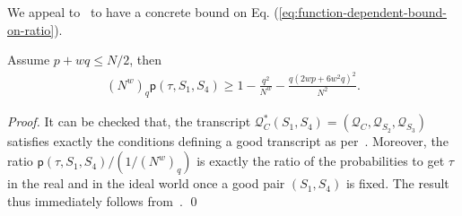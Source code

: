 We appeal to~\cite{C:CDKLST18} to have a concrete bound on Eq. (\ref{eq:function-dependent-bound-on-ratio}).

\begin{lemma}
	\label{lemma:bound-middle-two-rounds}
	
	Assume $p+wq\leq N/2$, then
	\begin{align}
	(N^w)_q{\mathsf{p}(\tau,S_1,S_4)} \geq 1-\frac{q^2}{N^w}-\frac{q(2wp+6w^2q)^2}{N^2}.
	\label{eq:bound-on-epsilon-middle}
	\end{align}
\end{lemma}
\begin{proof}
It can be checked that, the transcript $\mathcal{Q}_C^*(S_1,S_4)=(\mathcal{Q}_C,\mathcal{Q}_{S_2},\mathcal{Q}_{S_3})$ satisfies exactly the conditions defining a good transcript as per~\cite[page 740]{C:CDKLST18}. Moreover,
the ratio ${\mathsf{p}(\tau,S_1,S_4)}/(1/(N^w)_q)$ is exactly the ratio of the probabilities to get $\tau$ in the real and in the ideal world once a good pair $(S_1,S_4)$ is fixed. The result thus immediately follows from~\cite[Lemma 9]{C:CDKLST18}.       \qed
\end{proof}




